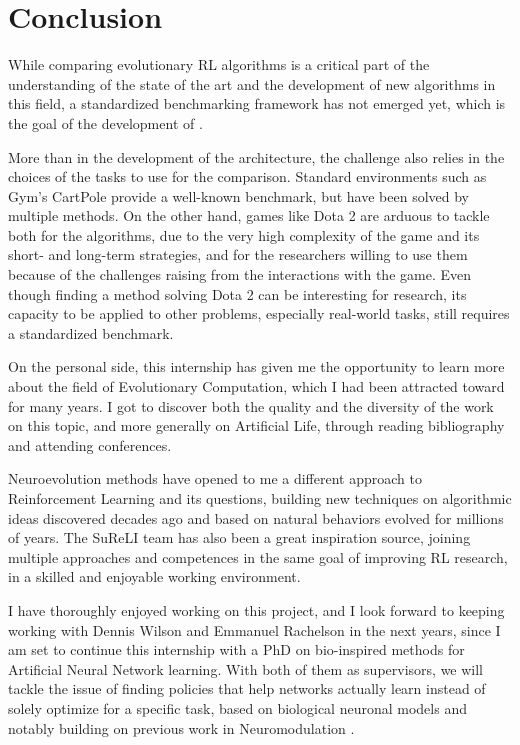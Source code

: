 \chapter*{Conclusion}
\label{chap:conclusion}

While comparing evolutionary RL algorithms is a critical part of the understanding of the state of the art and the development of new algorithms in this field, a standardized benchmarking framework has not emerged yet, which is the goal of the development of \berl. 

More than in the development of the architecture, the challenge also relies in the choices of the tasks to use for the comparison. Standard environments such as Gym's CartPole provide a well-known benchmark, but have been solved by multiple methods. On the other hand, games like Dota 2 are arduous to tackle both for the algorithms, due to the very high complexity of the game and its short- and long-term strategies, and for the researchers willing to use them because of the challenges raising from the interactions with the game. Even though finding a method solving Dota 2 can be interesting for research, its capacity to be applied to other problems, especially real-world tasks, still requires a standardized benchmark. 

On the personal side, this internship has given me the opportunity to learn more about the field of Evolutionary Computation, which I had been attracted toward for many years. I got to discover both the quality and the diversity of the work on this topic, and more generally on Artificial Life, through reading bibliography and attending conferences. 

Neuroevolution methods have opened to me a different approach to Reinforcement Learning and its questions, building new techniques on algorithmic ideas discovered decades ago and based on natural behaviors evolved for millions of years. The SuReLI team has also been a great inspiration source, joining multiple approaches and competences in the same goal of improving RL research, in a skilled and enjoyable working environment. 

I have thoroughly enjoyed working on this project, and I look forward to keeping working with Dennis Wilson and Emmanuel Rachelson in the next years, since I am set to continue this internship with a PhD on bio-inspired methods for Artificial Neural Network learning. With both of them as supervisors, we will tackle the issue of finding policies that help networks actually learn instead of solely optimize for a specific task, based on biological neuronal models and notably building on previous work in Neuromodulation \cite{neuromodulation}. 

